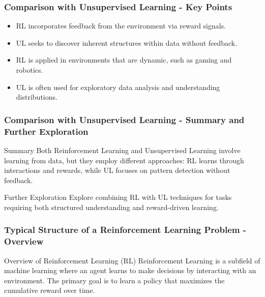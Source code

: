 \documentclass[aspectratio=169]{beamer}
\begin{document}
\begin{frame}[fragile]
    \frametitle{Comparison with Unsupervised Learning - Key Points}
    \begin{itemize}
        \item RL incorporates feedback from the environment via reward signals.
        \item UL seeks to discover inherent structures within data without feedback.
        \item RL is applied in environments that are dynamic, such as gaming and robotics.
        \item UL is often used for exploratory data analysis and understanding distributions.
    \end{itemize}
\end{frame}

\begin{frame}[fragile]
    \frametitle{Comparison with Unsupervised Learning - Summary and Further Exploration}
    \begin{block}{Summary}
        Both Reinforcement Learning and Unsupervised Learning involve learning from data, but they employ different approaches: RL learns through interactions and rewards, while UL focuses on pattern detection without feedback.
    \end{block}
    
    \begin{block}{Further Exploration}
        Explore combining RL with UL techniques for tasks requiring both structured understanding and reward-driven learning.
    \end{block}
\end{frame}

\begin{frame}[fragile]
    \frametitle{Typical Structure of a Reinforcement Learning Problem - Overview}
    \begin{block}{Overview of Reinforcement Learning (RL)}
        Reinforcement Learning is a subfield of machine learning where an agent learns to make decisions by interacting with an environment. The primary goal is to learn a policy that maximizes the cumulative reward over time.
    \end{block}
\end{frame}
\end{document}

